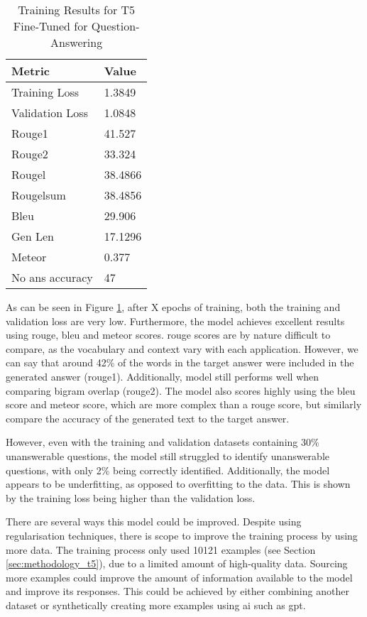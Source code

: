 \begin{table}[h]
    \centering
    \begin{tabular}{l|l}
        \textbf{Metric} & \textbf{Value} \\ \hline
        Training Loss & 1.3849 \\ \hline
        Validation Loss & 1.0848 \\ \hline
        Rouge1 & 41.527 \\ \hline
        Rouge2 & 33.324 \\ \hline
        Rougel & 38.4866 \\ \hline
        Rougelsum & 38.4856 \\ \hline
        Bleu & 29.906 \\ \hline
        Gen Len & 17.1296 \\ \hline
        Meteor & 0.377 \\ \hline
        No ans accuracy & 47 \\
    \end{tabular}
    \caption{Training Results for T5 Fine-Tuned for Question-Answering}
    \label{tab:results_t5}
\end{table}

As can be seen in Figure \ref{tab:results_t5}, after X epochs of training, both the training and validation loss are very low. Furthermore, the model achieves excellent results using \acrshort{rouge}, \acrshort{bleu} and \acrshort{meteor} scores. \acrshort{rouge} scores are by nature difficult to compare, as the vocabulary and context vary with each application. However, we can say that around 42\% of the words in the target answer were included in the generated answer (\acrshort{rouge}1). Additionally, model still performs well when comparing bigram overlap (\acrshort{rouge}2). The model also scores highly using the \acrshort{bleu} score and \acrshort{meteor} score, which are more complex than a \acrshort{rouge} score, but similarly compare the accuracy of the generated text to the target answer.

However, even with the training and validation datasets containing 30\% unanswerable questions, the model still struggled to identify unanswerable questions, with only 2\% being correctly identified. Additionally, the model appears to be underfitting, as opposed to overfitting to the data. This is shown by the training loss being higher than the validation loss.

There are several ways this model could be improved. Despite using regularisation techniques, there is scope to improve the training process by using more data. The training process only used 10121 examples (see Section \ref{sec:methodology_t5}), due to a limited amount of high-quality data. Sourcing more examples could improve the amount of information available to the model and improve its responses. This could be achieved by either combining another dataset or synthetically creating more examples using \acrlong{ai} such as \acrshort{gpt}.

